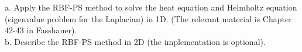 a. Apply the RBF-PS method to solve the heat equation and Helmholtz equation (eigenvalue problem for the
Laplacian) in 1D. (The relevant material is Chapter 42-43 in Fasshauer).\\

b. Describe the RBF-PS method in 2D (the implementation is optional).\\\\

\begin{solution}\renewcommand{\qedsymbol}{}\ \\

\end{solution}